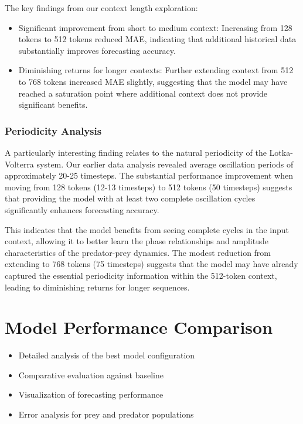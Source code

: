 \documentclass{article}
\begin{document}
The key findings from our context length exploration:
\begin{itemize}
    \item Significant improvement from short to medium context: Increasing from 128 tokens to 512 tokens reduced MAE, indicating that additional historical data substantially improves forecasting accuracy.
    \item Diminishing returns for longer contexts: Further extending context from 512 to 768 tokens increased MAE slightly, suggesting that the model may have reached a saturation point where additional context does not provide significant benefits.
\end{itemize}
\subsubsection*{Periodicity Analysis}
A particularly interesting finding relates to the natural periodicity of the Lotka-Volterra system. Our earlier data analysis revealed average oscillation periods of approximately 20-25 timesteps. The substantial performance improvement when moving from 128 tokens (12-13 timesteps) to 512 tokens (50 timesteps) suggests that providing the model with at least two complete oscillation cycles significantly enhances forecasting accuracy.

This indicates that the model benefits from seeing complete cycles in the input context, allowing it to better learn the phase relationships and amplitude characteristics of the predator-prey dynamics. The modest reduction from extending to 768 tokens (75 timesteps) suggests that the model may have already captured the essential periodicity information within the 512-token context, leading to diminishing returns for longer sequences.


\section*{Model Performance Comparison}

\begin{itemize}
    \item Detailed analysis of the best model configuration
   \item  Comparative evaluation against baseline
   \item  Visualization of forecasting performance
   \item Error analysis for prey and predator populations
\end{itemize}
\end{document}
